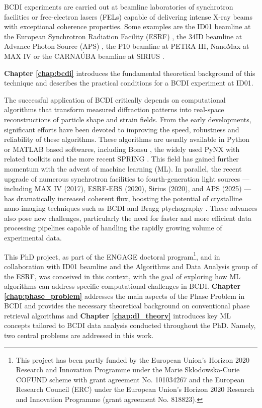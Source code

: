 BCDI experiments are carried out at beamline laboratories of synchrotron facilities or free-electron lasers (FELs) capable 
of delivering intense X-ray beams with exceptional coherence properties. Some examples are the ID01 beamline at the European 
Synchrotron Radiation Facility (ESRF) \cite{leake_nanodiffraction_2019}, the 34ID beamline at Advance Photon Source (APS) \cite{Pateras:yi5095}, the P10 beamline at PETRA III, 
NanoMax at MAX IV \cite{MAXIV60nm} or the CARNAÚBA beamline at SIRIUS \cite{Tolentino_2017}. 

\textbf{Chapter \ref*{chap:bcdi}} introduces the fundamental theoretical background of this technique and 
describes the practical conditions for a BCDI experiment at ID01.

The successful application of BCDI critically depends on computational algorithms that transform measured diffraction 
patterns into real-space reconstructions of particle shape and strain fields. From the early developments,
significant efforts have been devoted to improving the speed, robustness and reliability of these algorithms. These 
algorithms are usually available in Python or MATLAB based softwares, including Bonsu \cite{Newton2012Bonsu}, the widely 
used PyNX \cite{favre-nicolin_pynx_2020} with related toolkits \cite{Simonne2022Gwaihir, Atlan2023cdiutils} and the 
more recent SPRING \cite{Colombo2025SPRING}. 
This field has gained further momentum with the advent of machine learning (ML). In parallel, the recent upgrade of 
numerous synchrotron facilities to fourth-generation light sources — including MAX IV (2017), ESRF-EBS (2020), 
Sirius (2020), and APS (2025) — has dramatically increased coherent flux, boosting the potential of crystalline 
nano-imaging techniques such as BCDI and Bragg ptychography \cite{Li2022, leake_nanodiffraction_2019, PhysRevLett.121.256101, Chamard2015}. These advances also pose new 
challenges, particularly the need for faster and more efficient data processing pipelines capable of handling the rapidly 
growing volume of experimental data.
\newpage

This PhD project, as part of the ENGAGE doctoral 
program\footnote[1]{This project has been partly funded by the European Union's 
Horizon 2020 Research and Innovation Programme under the Marie Sklodowska-Curie COFUND scheme with grant agreement 
No. 101034267 and the European Research Council (ERC) under the European Union's Horizon 2020 Research and Innovation 
Programme (grant agreement No. 818823).}, and in collaboration with ID01 beamline and the Algorithms 
and Data Analysis group of the ESRF, was conceived in this context, with the goal of exploring how ML algorithms can address specific 
computational challenges in BCDI. \textbf{Chapter \ref{chap:phase_problem}} addresses the main aspects of the Phase 
Problem in BCDI and provides the necessary theoretical background on 
conventional phase retrieval algorithms and \textbf{Chapter \ref{chap:dl_theory}} introduces key ML concepts tailored 
to BCDI data analysis conducted throughout the PhD. Namely, two central problems are addressed in this work.

